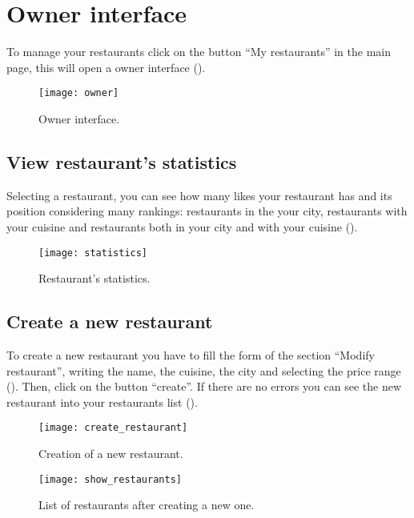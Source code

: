 \section{Owner interface}

To manage your restaurants click on the button ``My restaurants'' in the main
page, this will open a owner interface ().

\begin{figure}[H]
	\texttt{[image: owner]}
	\caption{Owner interface.}\label{fig:owner}
\end{figure}

\subsection{View restaurant's statistics}

Selecting a restaurant, you can see how many likes your restaurant has and its
position considering many rankings: restaurants in the your city, restaurants
with your cuisine and restaurants both in your city and with your cuisine
().

\begin{figure}[H]
	\texttt{[image: statistics]}
	\caption{Restaurant's statistics.}\label{fig:statistics}
\end{figure}

\subsection{Create a new restaurant}

To create a new restaurant you have to fill the form of the section ``Modify
restaurant'', writing the name, the cuisine, the city and selecting the price
range (). Then, click on the button ``create''. If
there are no errors you can see the new restaurant into your restaurants list
().

\begin{figure}[H]
	\texttt{[image: create\_restaurant]}
	\caption{Creation of a new restaurant.}\label{fig:create_restaurant}
\end{figure}

\begin{figure}[H]
	\texttt{[image: show\_restaurants]}
	\caption{List of restaurants after creating a new one.}\label{fig:show_restaurants}
\end{figure}

